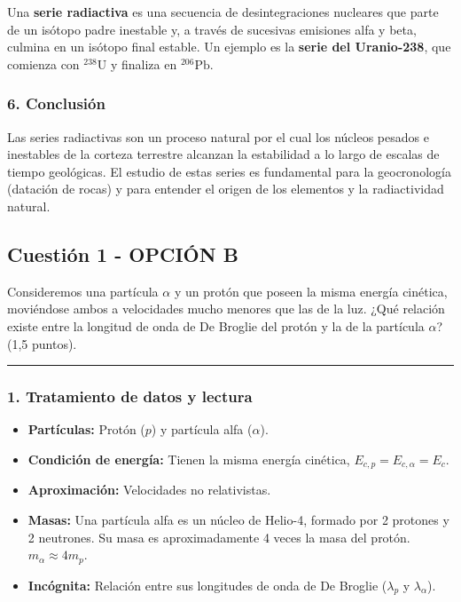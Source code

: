 \begin{cajaresultado}
Una \textbf{serie radiactiva} es una secuencia de desintegraciones nucleares que parte de un isótopo padre inestable y, a través de sucesivas emisiones alfa y beta, culmina en un isótopo final estable.
Un ejemplo es la \textbf{serie del Uranio-238}, que comienza con ${}^{238}\text{U}$ y finaliza en ${}^{206}\text{Pb}$.
\end{cajaresultado}

\subsubsection*{6. Conclusión}
\begin{cajaconclusion}
Las series radiactivas son un proceso natural por el cual los núcleos pesados e inestables de la corteza terrestre alcanzan la estabilidad a lo largo de escalas de tiempo geológicas. El estudio de estas series es fundamental para la geocronología (datación de rocas) y para entender el origen de los elementos y la radiactividad natural.
\end{cajaconclusion}

\newpage

\subsection{Cuestión 1 - OPCIÓN B}
\label{subsec:6B_2007_jun_ord}

\begin{cajaenunciado}
Consideremos una partícula $\alpha$ y un protón que poseen la misma energía cinética, moviéndose ambos a velocidades mucho menores que las de la luz. ¿Qué relación existe entre la longitud de onda de De Broglie del protón y la de la partícula $\alpha$? (1,5 puntos).
\end{cajaenunciado}
\hrule

\subsubsection*{1. Tratamiento de datos y lectura}
\begin{itemize}
    \item \textbf{Partículas:} Protón ($p$) y partícula alfa ($\alpha$).
    \item \textbf{Condición de energía:} Tienen la misma energía cinética, $E_{c,p} = E_{c,\alpha} = E_c$.
    \item \textbf{Aproximación:} Velocidades no relativistas.
    \item \textbf{Masas:} Una partícula alfa es un núcleo de Helio-4, formado por 2 protones y 2 neutrones. Su masa es aproximadamente 4 veces la masa del protón. $m_{\alpha} \approx 4m_p$.
    \item \textbf{Incógnita:} Relación entre sus longitudes de onda de De Broglie ($\lambda_p$ y $\lambda_{\alpha}$).
\end{itemize}


